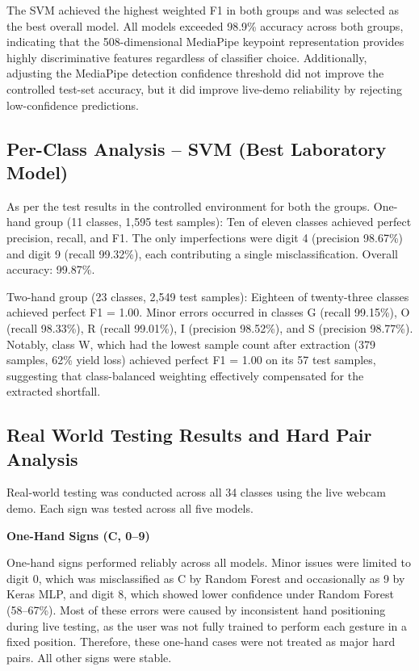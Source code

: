 \documentclass[conference]{IEEEtran}
\begin{document}
The SVM achieved the highest weighted F1 in both groups and was selected as the best overall model. All models exceeded 98.9\% accuracy across both groups, indicating that the 508-dimensional MediaPipe keypoint representation provides highly discriminative features regardless of classifier choice. Additionally, adjusting the MediaPipe detection confidence threshold did not improve the controlled test-set accuracy, but it did improve live-demo reliability by rejecting low-confidence predictions.

\subsection{Per-Class Analysis -- SVM (Best Laboratory Model)}

As per the test results in the controlled environment for both the groups.
One-hand group (11 classes, 1,595 test samples): Ten of eleven classes achieved perfect precision, recall, and F1. The only imperfections were digit 4 (precision 98.67\%) and digit 9 (recall 99.32\%), each contributing a single misclassification. Overall accuracy: 99.87\%.

Two-hand group (23 classes, 2,549 test samples): Eighteen of twenty-three classes achieved perfect F1 = 1.00. Minor errors occurred in classes G (recall 99.15\%), O (recall 98.33\%), R (recall 99.01\%), I (precision 98.52\%), and S (precision 98.77\%). Notably, class W, which had the lowest sample count after extraction (379 samples, 62\% yield loss) achieved perfect F1 = 1.00 on its 57 test samples, suggesting that class-balanced weighting effectively compensated for the extracted shortfall.

\subsection{Real World Testing Results and Hard Pair Analysis}

Real-world testing was conducted across all 34 classes using the live webcam demo. Each sign was tested across all five models.

\textbf{One-Hand Signs (C, 0--9)}

One-hand signs performed reliably across all models. Minor issues were limited to digit 0, which was misclassified as C by Random Forest and occasionally as 9 by Keras MLP, and digit 8, which showed lower confidence under Random Forest (58--67\%). Most of these errors were caused by inconsistent hand positioning during live testing, as the user was not fully trained to perform each gesture in a fixed position. Therefore, these one-hand cases were not treated as major hard pairs. All other signs were stable.
\end{document}
